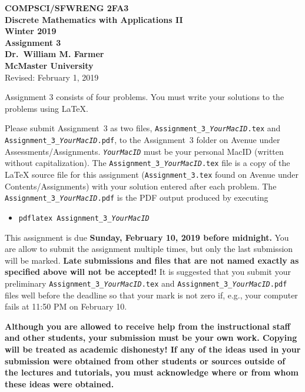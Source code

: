 \documentclass[11pt,fleqn]{article}
\begin{document}
\begin{center}

  {\large \textbf{COMPSCI/SFWRENG 2FA3}}\\[2mm]
  {\large \textbf{Discrete Mathematics with Applications II}}\\[2mm]
  {\large \textbf{Winter 2019}}\\[8mm]
  {\huge \textbf{Assignment 3}}\\[6mm]
  {\large \textbf{Dr.~William M. Farmer}}\\[2mm]
  {\large \textbf{McMaster University}}\\[6mm]
  {\large Revised: February 1, 2019}

\end{center}

\medskip

Assignment 3 consists of four problems.  You must write your solutions
to the problems using LaTeX.

Please submit Assignment~3 as two files,
\texttt{Assignment\_3\_\emph{YourMacID}.tex} and
\texttt{Assignment\_3\_\emph{YourMacID}.pdf}, to the Assignment~3
folder on Avenue under Assessments/Assignments.
\texttt{\emph{YourMacID}} must be your personal MacID (written without
capitalization).  The \texttt{Assignment\_3\_\emph{YourMacID}.tex}
file is a copy of the LaTeX source file for this assignment
(\texttt{Assignment\_3.tex} found on Avenue under
Contents/Assignments) with your solution entered after each problem.
The \texttt{Assignment\_3\_\emph{YourMacID}.pdf} is the PDF output
produced by executing

\begin{itemize}

  \item[] \texttt{pdflatex Assignment\_3\_\emph{YourMacID}}

\end{itemize}

This assignment is due \textbf{Sunday, February 10, 2019 before
  midnight.}  You are allow to submit the assignment multiple times,
but only the last submission will be marked.  \textbf{Late submissions
  and files that are not named exactly as specified above will not be
  accepted!}  It is suggested that you submit your preliminary
\texttt{Assignment\_3\_\emph{YourMacID}.tex} and
\texttt{Assignment\_3\_\emph{YourMacID}.pdf} files well before the
deadline so that your mark is not zero if, e.g., your computer fails
at 11:50 PM on February 10.

\textbf{Although you are allowed to receive help from the
  instructional staff and other students, your submission must be your
  own work.  Copying will be treated as academic dishonesty! If any of
  the ideas used in your submission were obtained from other students
  or sources outside of the lectures and tutorials, you must
  acknowledge where or from whom these ideas were obtained.}
\end{document}
